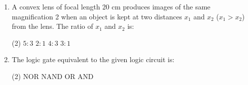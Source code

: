 \documentclass{article}
\renewcommand{\ans}{\quad}
\begin{document}
\begin{enumerate}
    \item A convex lens of focal length 20 cm produces images of the same magnification 2 when an object is kept at two distances \(x_1\) and \(x_2\) (\(x_1 > x_2\)) from the lens. The ratio of \(x_1\) and \(x_2\) is:
        \begin{tasks}(2)
            \task \(5 : 3\)
            \task \(2 : 1\)
            \task \(4 : 3\)
            \task \(3 : 1\)\ans
        \end{tasks}


    \item The logic gate equivalent to the given logic circuit is:
    \begin{center}
    \end{center}
        \begin{tasks}(2)
            	\task NOR
            	\task NAND
            	\task OR \ans
            	\task AND
        \end{tasks}

\end{enumerate}
\end{document}
